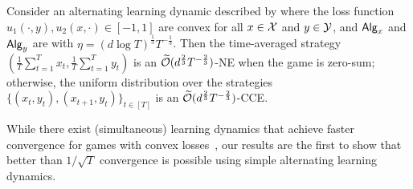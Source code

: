 \begin{corollary}\label{cor:game with entropic barrier}
    Consider an alternating learning dynamic described by  where the loss function $u_1(\cdot,y),u_2(x,\cdot)\in[-1,1]$ are convex for all $x\in{\mathcal{X}}$ and $y\in{\mathcal{Y}}$, and ${\mathsf{Alg}}_x$ and ${\mathsf{Alg}}_y$ are  with $\eta=(d\log T)^{\frac{1}{3}}T^{-\frac{1}{3}}$. Then the time-averaged strategy $(\frac{1}{T}\sum_{t=1}^T x_t, \frac{1}{T}\sum_{t=1}^T y_t)$ is an $\widetilde{\mathcal{O}}(d^{\frac{2}{3}}T^{-\frac{2}{3}})$-NE when the game is zero-sum; otherwise, the uniform distribution over the strategies $\{(x_t,y_t), (x_{t+1},y_t)\}_{t\in[T]}$ is an $\widetilde{\mathcal{O}}(d^{\frac{2}{3}}T^{-\frac{2}{3}})$-CCE.
\end{corollary}

While there exist (simultaneous) learning dynamics that achieve faster convergence for games with convex losses~\citep{syrgkanis2015fast, farina2022near},
our results are the first to show that better than $1/\sqrt{T}$ convergence is possible using simple alternating learning dynamics.

